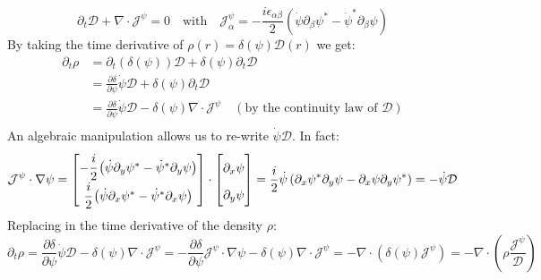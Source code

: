 \documentclass[11pt]{article}
\begin{document}
\begin{equation}
    \partial_t \mathcal{D} +\nabla \cdot \bm{\mathcal{J}}^\psi = 0 \quad \text{with} \quad \mathcal{J}^\psi_\alpha = -\frac{i \epsilon_{\alpha\beta}}{2}\left(\dot \psi \partial_\beta \psi^*-\dot \psi^*\partial_\beta \psi\right)
\end{equation}
By taking the time derivative of $\rho(r)=\delta(\psi)\mathcal{D}(r)$ we get:
\begin{equation}
    \begin{aligned}
        \partial_t\rho &= \partial_t(\delta( \psi))\mathcal{D}+ \delta(\psi) \partial_t \mathcal{D}\\
        &=\frac{\partial \delta}{\partial \psi} \dot{\psi}\mathcal{D}+\delta(\psi) \partial_t \mathcal{D}\\
        &=\frac{\partial \delta}{\partial \psi} \dot{\psi}\mathcal{D}-\delta(\psi) \nabla \cdot \mathcal{J}^\psi \quad (\text{by the continuity law of } \mathcal{D})\\
    \end{aligned} 
\end{equation}
An algebraic manipulation allows us to re-write $\dot{\psi}\mathcal{D}$. In fact:
\begin{equation}
    \renewcommand\arraystretch{1.8}
    \mathcal{J}^\psi\cdot \nabla\psi = \begin{bmatrix}
        -\cfrac{i}{2} \left(\dot \psi \partial_y \psi^*-\dot \psi^*\partial_y \psi\right) \\
        \cfrac{i}{2} \left(\dot \psi \partial_x \psi^*-\dot \psi^*\partial_x \psi\right)
    \end{bmatrix} \cdot \begin{bmatrix}
        \partial_x \psi \\
            \partial_y \psi
    \end{bmatrix} = \frac{i}{2} \dot \psi \left( \partial_x\psi^*\partial_y \psi-\partial_x\psi\partial_y \psi^*\right) = -\dot \psi \mathcal{D}
\end{equation}
Replacing in the time derivative of the density $\rho$:
\begin{equation}
    \partial_t \rho = \frac{\partial \delta}{\partial \psi} \dot{\psi}\mathcal{D}-\delta(\psi) \nabla \cdot \mathcal{J}^\psi= -\frac{\partial \delta}{\partial \psi} \mathcal{J}^\psi\cdot \nabla\psi-\delta(\psi) \nabla \cdot \mathcal{J}^\psi = - \nabla\cdot(\delta(\psi)  \mathcal{J}^\psi) = - \nabla\cdot(\rho \frac{ \mathcal{J}^\psi}{\mathcal{D}})
\end{equation}
\end{document}
